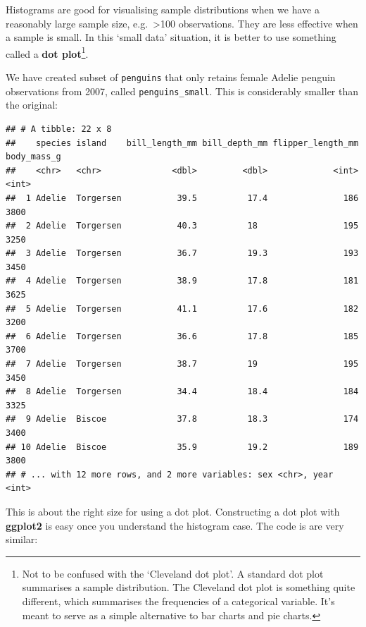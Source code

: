 \documentclass[
]{book}
\begin{document}
Histograms are good for visualising sample distributions when we have a reasonably large sample size, e.g.~\textgreater100 observations. They are less effective when a sample is small. In this `small data' situation, it is better to use something called a \textbf{dot plot}\footnote{Not to be confused with the `Cleveland dot plot'. A standard dot plot summarises a sample distribution. The Cleveland dot plot is something quite different, which summarises the frequencies of a categorical variable. It's meant to serve as a simple alternative to bar charts and pie charts.}.

We have created subset of \texttt{penguins} that only retains female Adelie penguin observations from 2007, called \texttt{penguins\_small}. This is considerably smaller than the original:

\begin{verbatim}
## # A tibble: 22 x 8
##    species island    bill_length_mm bill_depth_mm flipper_length_mm body_mass_g
##    <chr>   <chr>              <dbl>         <dbl>             <int>       <int>
##  1 Adelie  Torgersen           39.5          17.4               186        3800
##  2 Adelie  Torgersen           40.3          18                 195        3250
##  3 Adelie  Torgersen           36.7          19.3               193        3450
##  4 Adelie  Torgersen           38.9          17.8               181        3625
##  5 Adelie  Torgersen           41.1          17.6               182        3200
##  6 Adelie  Torgersen           36.6          17.8               185        3700
##  7 Adelie  Torgersen           38.7          19                 195        3450
##  8 Adelie  Torgersen           34.4          18.4               184        3325
##  9 Adelie  Biscoe              37.8          18.3               174        3400
## 10 Adelie  Biscoe              35.9          19.2               189        3800
## # ... with 12 more rows, and 2 more variables: sex <chr>, year <int>
\end{verbatim}

This is about the right size for using a dot plot. Constructing a dot plot with \textbf{ggplot2} is easy once you understand the histogram case. The code is are very similar:
\end{document}
